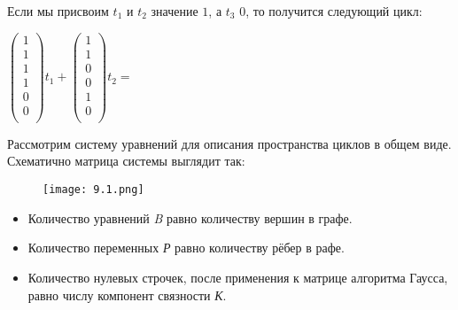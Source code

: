\documentclass[russian]{lecture-notes}
\begin{document}
\begin{example}
    Если мы присвоим $t_1$ и $t_2$ значение $1$, а $t_3$ $0$, то получится следующий цикл:
    
$
\begin{pmatrix}
  1\\
  1\\
  1\\
  1\\
  0\\
  0\\
\end{pmatrix}
t_1
+
\begin{pmatrix}
  1\\
  1\\
  0\\
  0\\
  1\\
  0\\
\end{pmatrix}
t_2
=
$
\end{example}

\newpage
{}
Рассмотрим систему уравнений для описания пространства циклов в общем виде. Схематично матрица системы выглядит так:
\begin{figure}[H]
    \centering
    \texttt{[image: 9.1.png]}
\end{figure}

\begin{itemize}
    \item Количество уравнений \emph{B} равно количеству вершин в графе. 
    \item Количество переменных \emph{Р} равно количеству рёбер в рафе.
    \item Количество нулевых строчек, после применения к матрице алгоритма Гаусса, равно числу компонент связности  \emph{К}.
\end{itemize}
\end{document}
